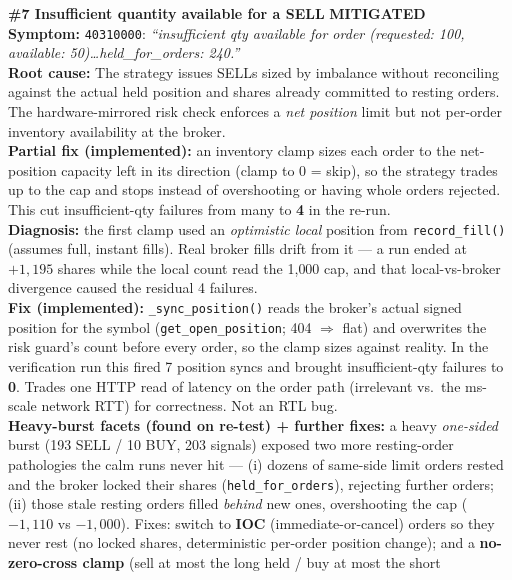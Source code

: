 \documentclass[10pt,a4paper]{article}
\newcommand{\mitig}{\textcolor{warnamber}{\textbf{MITIGATED}}}
\begin{document}
\begin{issuebox}
\textbf{\#7 \quad Insufficient quantity available for a SELL} \hfill \mitig\\
\textbf{Symptom:} \texttt{40310000}: \emph{``insufficient qty available for order
(requested: 100, available: 50)\dots held\_for\_orders: 240.''}\\
\textbf{Root cause:} The strategy issues SELLs sized by imbalance without
reconciling against the actual held position and shares already committed to
resting orders. The hardware-mirrored risk check enforces a \emph{net position}
limit but not per-order inventory availability at the broker.\\
\textbf{Partial fix (implemented):} an inventory clamp sizes each order to the
net-position capacity left in its direction (clamp to 0 = skip), so the strategy
trades up to the cap and stops instead of overshooting or having whole orders
rejected. This cut insufficient-qty failures from many to \textbf{4} in the
re-run.\\
\textbf{Diagnosis:} the first clamp used an \emph{optimistic local} position from
\texttt{record\_fill()} (assumes full, instant fills). Real broker fills drift
from it --- a run ended at $+1{,}195$ shares while the local count read the
1{,}000 cap, and that local-vs-broker divergence caused the residual 4
failures.\\
\textbf{Fix (implemented):} \texttt{\_sync\_position()} reads the broker's actual
signed position for the symbol (\texttt{get\_open\_position}; 404 $\Rightarrow$
flat) and overwrites the risk guard's count before every order, so the clamp
sizes against reality. In the verification run this fired 7 position syncs and
brought insufficient-qty failures to \textbf{0}. Trades one HTTP read of latency
on the order path (irrelevant vs.\ the ms-scale network RTT) for correctness.
Not an RTL bug.\\
\textbf{Heavy-burst facets (found on re-test) + further fixes:} a heavy
\emph{one-sided} burst (193 SELL / 10 BUY, 203 signals) exposed two more
resting-order pathologies the calm runs never hit --- (i) dozens of same-side
limit orders rested and the broker locked their shares
(\texttt{held\_for\_orders}), rejecting further orders; (ii) those stale resting
orders filled \emph{behind} new ones, overshooting the cap ($-1{,}110$ vs
$-1{,}000$). Fixes: switch to \textbf{IOC} (immediate-or-cancel) orders so they
never rest (no locked shares, deterministic per-order position change); and a
\textbf{no-zero-cross clamp} (sell at most the long held / buy at most the short

\end{issuebox}
\end{document}
